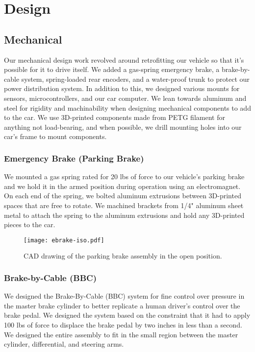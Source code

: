 \section{Design}

\subsection{Mechanical}

Our mechanical design work revolved around retrofitting our vehicle so
that it's possible for it to drive itself. We added a gas-spring
emergency brake, a brake-by-cable system, spring-loaded rear encoders,
and a water-proof trunk to protect our power distribution system. In
addition to this, we designed various mounts for sensors,
microcontrollers, and our car computer. We lean towards aluminum and
steel for rigidity and machinability when designing mechanical
components to add to the car. We use 3D-printed components made from
PETG filament for anything not load-bearing, and when possible, we
drill mounting holes into our car's frame to mount components.

\subsubsection{Emergency Brake (Parking Brake)}

We mounted a gas spring rated for 20 lbs of force to our vehicle's
parking brake and we hold it in the armed position during operation
using an electromagnet. On each end of the spring, we bolted aluminum
extrusions between 3D-printed spaces that are free to rotate. We
machined brackets from 1/4" aluminum sheet metal to attach the spring
to the aluminum extrusions and hold any 3D-printed pieces to the car.

\begin{figure}[ht!]
  \centering
  \texttt{[image: ebrake-iso.pdf]}
  \caption{CAD drawing of the parking brake assembly in the open position.}
\end{figure}

\subsubsection{Brake-by-Cable (BBC)}

We designed the Brake-By-Cable (BBC) system for fine control over
pressure in the master brake cylinder to better replicate a human
driver's control over the brake pedal. We designed the system based on
the constraint that it had to apply 100 lbs of force to displace the
brake pedal by two inches in less than a second. We designed the entire
assembly to fit in the small region between the master cylinder,
differential, and steering arms.

